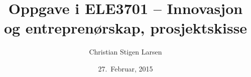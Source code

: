 \documentclass[a4paper]{report}
\begin{document}
  \author{Christian Stigen Larsen}
  \date{27.~Februar, 2015}
  \title{\textsf{Oppgave i ELE3701 -- Innovasjon og entreprenørskap, prosjektskisse}}

  \maketitle
  
  
\end{document}

